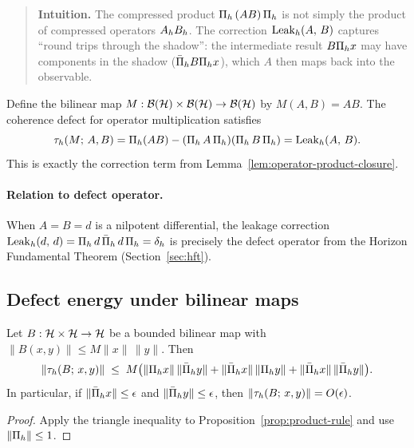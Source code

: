 \begin{quote}\small
\textbf{Intuition.} The compressed product $\CCRestr{(AB)}{h}$ is not simply the product of compressed operators $\CCObs{A}{h} \CCObs{B}{h}$. The correction $\CCLeakCorr{h}{A}{B}$ captures ``round trips through the shadow'': the intermediate result $B \CCPi{h} x$ may have components in the shadow ($\CCPibar{h} B \CCPi{h} x$), which $A$ then maps back into the observable.
\end{quote}

\begin{corollary}
\label{cor:product-connection}
Define the bilinear map $M: \cB(\cH) \times \cB(\cH) \to \cB(\cH)$ by $M(A, B) = AB$. The coherence defect for operator multiplication satisfies
\[
\CCTauBi{h}{M}{A}{B} = \CCPi{h} (AB) - (\CCRestr{A}{h})(\CCRestr{B}{h}) = \CCLeakCorr{h}{A}{B}.
\]
This is exactly the correction term from Lemma~\ref{lem:operator-product-closure}.
\end{corollary}

\paragraph{Relation to defect operator.}
When $A = B = d$ is a nilpotent differential, the leakage correction $\CCLeakCorr{h}{d}{d} = \CCDefectExpr{d}{h} = \CCDefect{d}{h}$ is precisely the defect operator from the Horizon Fundamental Theorem (Section~\ref{sec:hft}).

\subsection{Defect energy under bilinear maps}

\begin{lemma}
\label{lem:bilinear-energy}
Let $B:\cH \times \cH \to \cH$ be a bounded bilinear map with $\|B(x,y)\| \le M\|x\|\,\|y\|$.
Then
\[
\|\CCTauBi{h}{B}{x}{y}\| \;\le\; M \bigl( \|\CCPi{h} x\|\,\|\CCPibar{h} y\| + \|\CCPibar{h} x\|\,\|\CCPi{h} y\| + \|\CCPibar{h} x\|\,\|\CCPibar{h} y\| \bigr).
\]
In particular, if $\|\CCPibar{h} x\| \le \epsilon$ and $\|\CCPibar{h} y\| \le \epsilon$, then $\|\CCTauBi{h}{B}{x}{y}\| = O(\epsilon)$.
\end{lemma}

\begin{proof}
Apply the triangle inequality to Proposition~\ref{prop:product-rule} and use $\|\CCPi{h}\| \le 1$.
\end{proof}

